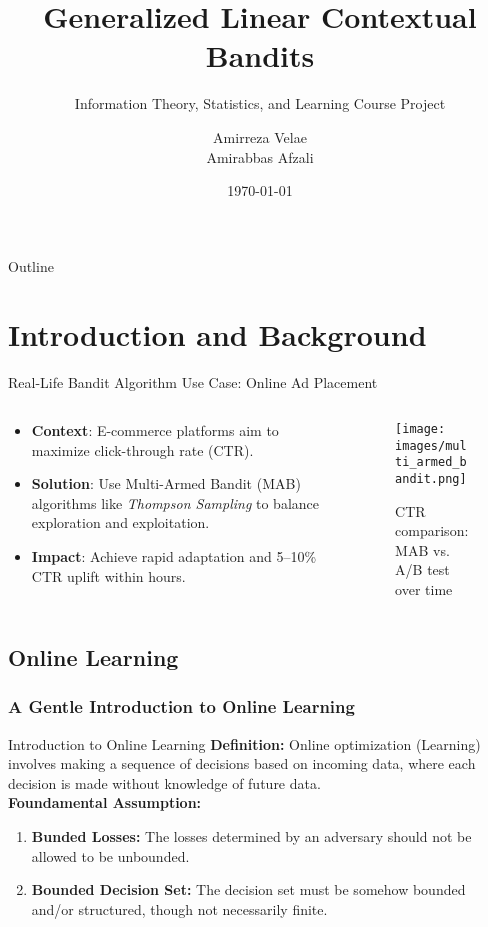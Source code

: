 \documentclass{beamer}
\title{Generalized Linear Contextual Bandits}
\subtitle{Information Theory, Statistics, and Learning Course Project}
\author{Amirreza Velae \\ Amirabbas Afzali}
\institute{Sharif University of Technology}
\date{\today}
\begin{document}
\begin{frame}
    \titlepage
\end{frame}

\begin{frame}{Outline}
    \tableofcontents
\end{frame}
\section{Introduction and Background}

\begin{frame}{Real-Life Bandit Algorithm Use Case: Online Ad Placement}
  \begin{columns}
    \begin{column}{0.6\textwidth}
      \begin{itemize}
        \item \textbf{Context}: E-commerce platforms aim to maximize click-through rate (CTR).
        \item \textbf{Solution}: Use Multi-Armed Bandit (MAB) algorithms like \textit{Thompson Sampling} to balance exploration and exploitation.
        \item \textbf{Impact}: Achieve rapid adaptation and 5–10\% CTR uplift within hours.
      \end{itemize}
    \end{column}
    \begin{column}{0.4\textwidth}
      \begin{figure}
        \centering
        \texttt{[image: images/multi\_armed\_bandit.png]}
        \caption{CTR comparison: MAB vs. A/B test over time}
      \end{figure}
    \end{column}
  \end{columns}
\end{frame}

\subsection{Online Learning}
\subsubsection{A Gentle Introduction to Online Learning}
\begin{frame}{Introduction to Online Learning}
  \textbf{Definition:} Online optimization (Learning) involves making a sequence of decisions based on incoming data, where each decision is made without knowledge of future data. \\
  \textbf{Foundamental Assumption:}
  \begin{enumerate}
    \item \textbf{Bunded Losses:} The losses determined by an adversary should not be allowed to be unbounded.
    \item \textbf{Bounded Decision Set:}  The decision set must be somehow bounded and/or structured, though not necessarily finite.
  \end{enumerate}
\end{frame}
\end{document}
